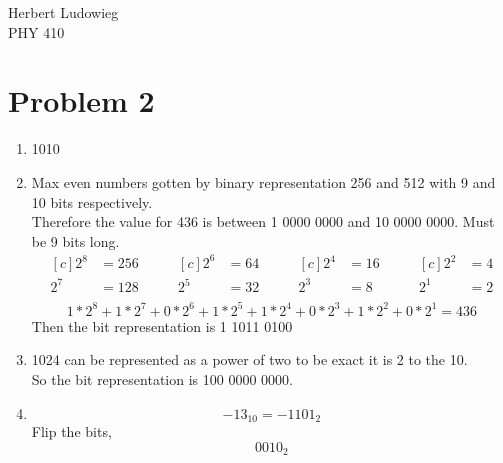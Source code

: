 \documentclass{article}
\begin{document}
Herbert Ludowieg\\
PHY 410
\section{Problem 2}
\begin{enumerate}[label=(\alph*)]
\item 1010
\item Max even numbers gotten by binary representation 256 and 512 with 9 and 10 bits respectively.\\
    Therefore the value for 436 is between 1 0000 0000 and 10 0000 0000. Must be 9 bits long.\\
    \begin{equation*}
    \begin{aligned}[c]
    2^8 &= 256 \\
    2^7 &= 128 \\
    \end{aligned}
    \qquad
    \begin{aligned}[c]
    2^6 &= 64  \\
    2^5 &= 32  \\
    \end{aligned}
    \qquad
    \begin{aligned}[c]
    2^4 &= 16  \\
    2^3 &= 8   \\
    \end{aligned}
    \qquad
    \begin{aligned}[c]
    2^2 &= 4   \\
    2^1 &= 2   \\
    \end{aligned}
    \end{equation*}
    \begin{equation*}
    1*2^8+1*2^7+0*2^6+1*2^5+1*2^4+0*2^3+1*2^2+0*2^1 = 436
    \end{equation*}
    Then the bit representation is 1 1011 0100
\item 1024 can be represented as a power of two to be exact it is 2 to the 10.\\
    So the bit representation is 100 0000 0000.
\item
    \begin{equation*}
    -13_{10} = -1101_{2}
    \end{equation*}
    Flip the bits,\\
    \begin{equation*}
    0010_{2}
    \end{equation*}

\end{enumerate}
\end{document}
